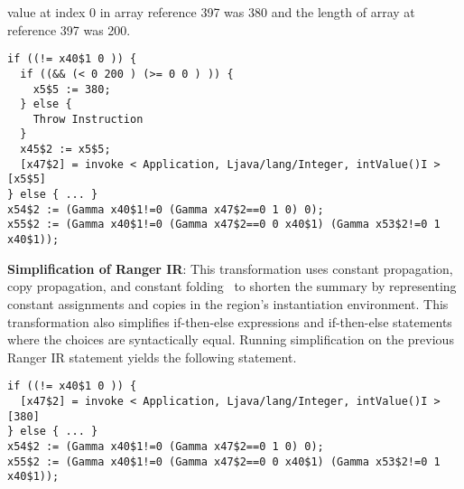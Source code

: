 value at index 0 in array reference 397 was 380 and the length of array at reference 397 was 200.\\
\begin{lstlisting}[numbers=none]
if ((!= x40$1 0 )) {
  if ((&& (< 0 200 ) (>= 0 0 ) )) {
    x5$5 := 380;
  } else {
    Throw Instruction
  }
  x45$2 := x5$5;
  [x47$2] = invoke < Application, Ljava/lang/Integer, intValue()I >[x5$5]
} else { ... }
x54$2 := (Gamma x40$1!=0 (Gamma x47$2==0 1 0) 0);
x55$2 := (Gamma x40$1!=0 (Gamma x47$2==0 0 x40$1) (Gamma x53$2!=0 1 x40$1));
\end{lstlisting}
%
\textbf{Simplification of Ranger IR}: This transformation uses constant propagation, copy propagation, and constant
folding~\cite{dragon-book} to shorten the summary by representing constant assignments and copies
in the region\rq s instantiation environment.
%
This transformation also simplifies if-then-else expressions and if-then-else statements where the choices are
syntactically equal.
%
Running simplification on the previous Ranger IR statement yields the following statement.
\begin{lstlisting}[numbers=none]
if ((!= x40$1 0 )) {
  [x47$2] = invoke < Application, Ljava/lang/Integer, intValue()I >[380]
} else { ... }
x54$2 := (Gamma x40$1!=0 (Gamma x47$2==0 1 0) 0);
x55$2 := (Gamma x40$1!=0 (Gamma x47$2==0 0 x40$1) (Gamma x53$2!=0 1 x40$1));
\end{lstlisting}
%
